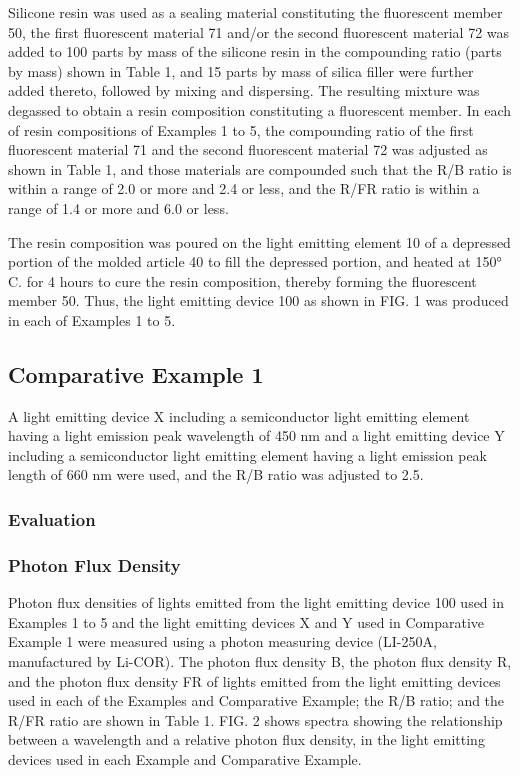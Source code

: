 \documentclass[11pt,a4paper]{article}
\begin{document}
Silicone resin was used as a sealing material constituting the fluorescent member 50, the first fluorescent material 71 and/or the second fluorescent material 72 was added to 100 parts by mass of the silicone resin in the compounding ratio (parts by mass) shown in Table 1, and 15 parts by mass of silica filler were further added thereto, followed by mixing and dispersing. The resulting mixture was degassed to obtain a resin composition constituting a fluorescent member. In each of resin compositions of Examples 1 to 5, the compounding ratio of the first fluorescent material 71 and the second fluorescent material 72 was adjusted as shown in Table 1, and those materials are compounded such that the R/B ratio is within a range of 2.0 or more and 2.4 or less, and the R/FR ratio is within a range of 1.4 or more and 6.0 or less.

The resin composition was poured on the light emitting element 10 of a depressed portion of the molded article 40 to fill the depressed portion, and heated at 150° C. for 4 hours to cure the resin composition, thereby forming the fluorescent member 50. Thus, the light emitting device 100 as shown in FIG. 1 was produced in each of Examples 1 to 5.

\subsection{Comparative Example 1}

A light emitting device X including a semiconductor light emitting element having a light emission peak wavelength of 450 nm and a light emitting device Y including a semiconductor light emitting element having a light emission peak length of 660 nm were used, and the R/B ratio was adjusted to 2.5.

\subsubsection{Evaluation}

\subsubsection{Photon Flux Density}

Photon flux densities of lights emitted from the light emitting device 100 used in Examples 1 to 5 and the light emitting devices X and Y used in Comparative Example 1 were measured using a photon measuring device (LI-250A, manufactured by Li-COR). The photon flux density B, the photon flux density R, and the photon flux density FR of lights emitted from the light emitting devices used in each of the Examples and Comparative Example; the R/B ratio; and the R/FR ratio are shown in Table 1. FIG. 2 shows spectra showing the relationship between a wavelength and a relative photon flux density, in the light emitting devices used in each Example and Comparative Example.
\end{document}
